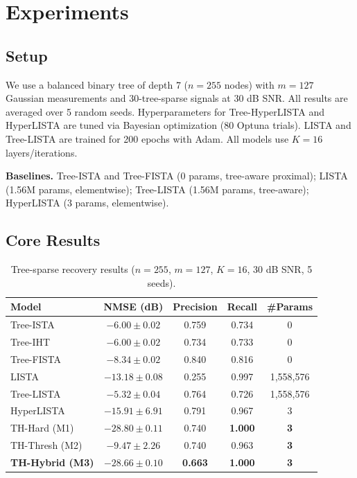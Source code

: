 \documentclass{article}
\begin{document}
\section{Experiments}

\subsection{Setup}

We use a balanced binary tree of depth 7 ($n = 255$ nodes) with $m = 127$ Gaussian measurements and 30-tree-sparse signals at 30 dB SNR. All results are averaged over 5 random seeds. Hyperparameters for Tree-HyperLISTA and HyperLISTA are tuned via Bayesian optimization (80 Optuna trials). LISTA and Tree-LISTA are trained for 200 epochs with Adam. All models use $K = 16$ layers/iterations.

\textbf{Baselines.} Tree-ISTA and Tree-FISTA (0 params, tree-aware proximal); LISTA (1.56M params, elementwise); Tree-LISTA (1.56M params, tree-aware); HyperLISTA (3 params, elementwise).

\subsection{Core Results}

\begin{table}[H]
\centering
    \caption{Tree-sparse recovery results ($n{=}255$, $m{=}127$, $K{=}16$, 30 dB SNR, 5 seeds).}
\label{tab:core}
\begin{tabular}{lcccc}
\toprule
\textbf{Model} & \textbf{NMSE (dB)} & \textbf{Precision} & \textbf{Recall} & \textbf{\#Params} \\
\midrule
Tree-ISTA  & $-6.00 \pm 0.02$ & 0.759 & 0.734 & 0 \\
Tree-IHT   & $-6.00 \pm 0.02$ & 0.734 & 0.733 & 0 \\
Tree-FISTA & $-8.34 \pm 0.02$ & 0.840 & 0.816 & 0 \\
LISTA      & $-13.18 \pm 0.08$ & 0.255 & 0.997 & 1,558,576 \\
Tree-LISTA & $-5.32 \pm 0.04$  & 0.764 & 0.726 & 1,558,576 \\
HyperLISTA & $-15.91 \pm 6.91$ & 0.791 & 0.967 & 3 \\
\midrule
TH-Hard (M1)          & $-28.80 \pm 0.11$ & 0.740 & \textbf{1.000} & \textbf{3} \\
TH-Thresh (M2)        & $-9.47 \pm 2.26$  & 0.740 & 0.963 & \textbf{3} \\
\textbf{TH-Hybrid (M3)} & $\mathbf{-28.66 \pm 0.10}$ & \textbf{0.663} & \textbf{1.000} & \textbf{3} \\
\bottomrule
\end{tabular}
\end{table}
\end{document}

